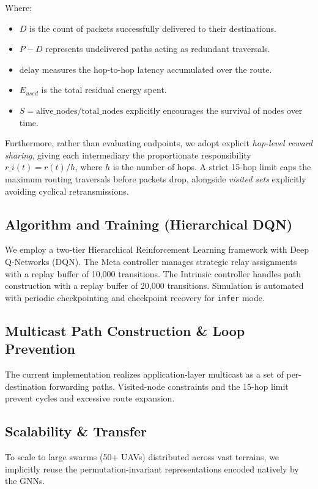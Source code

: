 \documentclass[conference]{IEEEtran}
\begin{document}
Where:
\begin{itemize}
    \item $D$ is the count of packets successfully delivered to their destinations.
    \item $P - D$ represents undelivered paths acting as redundant traversals.
    \item $\text{delay}$ measures the hop-to-hop latency accumulated over the route.
    \item $E_{used}$ is the total residual energy spent.
    \item $S = \text{alive\_nodes} / \text{total\_nodes}$ explicitly encourages the survival of nodes over time.
\end{itemize}
Furthermore, rather than evaluating endpoints, we adopt explicit \textit{hop-level reward sharing}, giving each intermediary the proportionate responsibility $r\_i(t) = r(t) / h$, where $h$ is the number of hops. A strict 15-hop limit caps the maximum routing traversals before packets drop, alongside \textit{visited sets} explicitly avoiding cyclical retransmissions.

\subsection{Algorithm and Training (Hierarchical DQN)}
We employ a two-tier Hierarchical Reinforcement Learning framework with Deep Q-Networks (DQN). The Meta controller manages strategic relay assignments with a replay buffer of 10,000 transitions. The Intrinsic controller handles path construction with a replay buffer of 20,000 transitions. Simulation is automated with periodic checkpointing and checkpoint recovery for \texttt{infer} mode.

\subsection{Multicast Path Construction \& Loop Prevention}
The current implementation realizes application-layer multicast as a set of per-destination forwarding paths. Visited-node constraints and the 15-hop limit prevent cycles and excessive route expansion.

\subsection{Scalability \& Transfer}
To scale to large swarms (50+ UAVs) distributed across vast terrains, we implicitly reuse the permutation-invariant representations encoded natively by the GNNs. 
\end{document}
